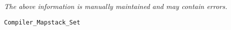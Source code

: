 \label{pkg:compiler\_mapstack\_set}

{\tiny \it The above information is manually maintained and may contain errors.}
\begin{verbatim}
Compiler_Mapstack_Set
\end{verbatim}
